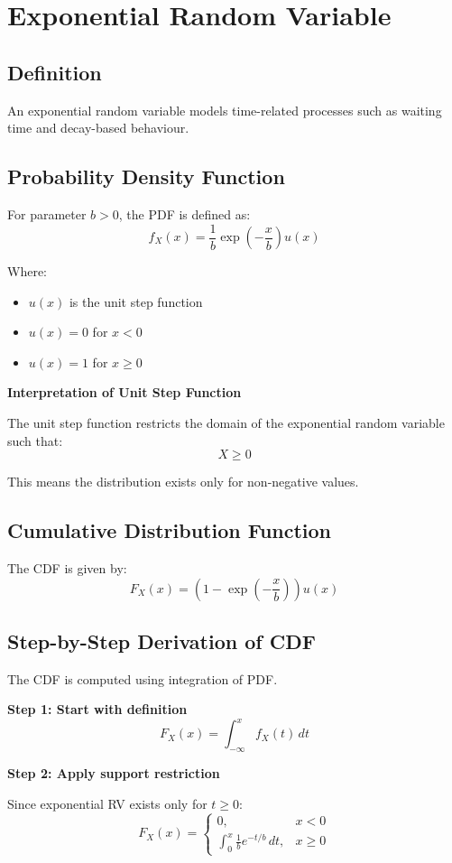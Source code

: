 \documentclass[12pt]{article}
\begin{document}
\section{Exponential Random Variable}

\subsection{Definition}
An exponential random variable models time-related processes such as waiting time and decay-based behaviour.

\subsection{Probability Density Function}
For parameter $b > 0$, the PDF is defined as:
\[
f_X(x) = \frac{1}{b} \exp\left(-\frac{x}{b}\right) u(x)
\]

Where:

\begin{itemize}
\item $u(x)$ is the unit step function
\item $u(x) = 0$ for $x < 0$
\item $u(x) = 1$ for $x \geq 0$
\end{itemize}

\textbf{Interpretation of Unit Step Function}

The unit step function restricts the domain of the exponential random variable such that:
\[
X \geq 0
\]

This means the distribution exists only for non-negative values.

\subsection{Cumulative Distribution Function}
The CDF is given by:
\[
F_X(x) = \left(1 - \exp\left(-\frac{x}{b}\right)\right) u(x)
\]

\subsection{Step-by-Step Derivation of CDF}

The CDF is computed using integration of PDF.

\textbf{Step 1: Start with definition}
\[
F_X(x) = \int_{-\infty}^{x} f_X(t)\,dt
\]

\textbf{Step 2: Apply support restriction}

Since exponential RV exists only for $t \geq 0$:
\[
F_X(x) =
\begin{cases}
0, & x < 0 \\
\int_0^x \frac{1}{b} e^{-t/b} \, dt, & x \geq 0
\end{cases}
\]
\end{document}
